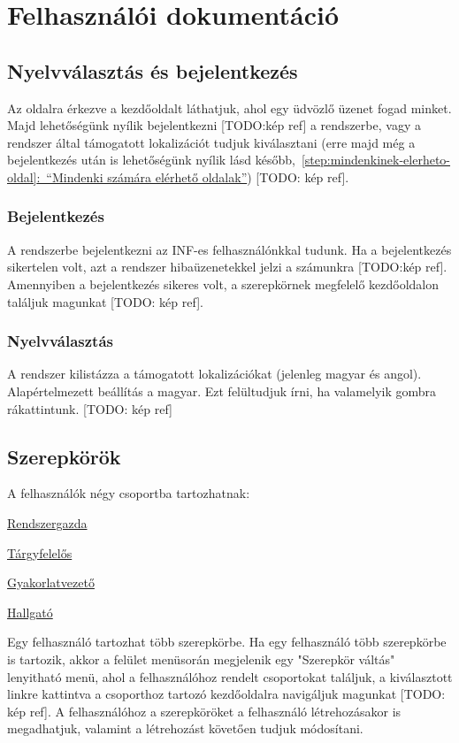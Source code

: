\chapter{Felhasználói dokumentáció} %
\label{ch:user}

\section{Nyelvválasztás és bejelentkezés}
Az oldalra érkezve a kezdőoldalt láthatjuk, ahol egy üdvözlő üzenet fogad minket. Majd lehetőségünk nyílik bejelentkezni [TODO:kép ref] a rendszerbe, vagy a rendszer által támogatott lokalizációt tudjuk kiválasztani (erre majd még a bejelentkezés után is lehetőségünk nyílik lásd később,~\hyperref[step:mindenkinek-elerheto-oldal]{\ref{step:mindenkinek-elerheto-oldal}:~``Mindenki számára elérhető oldalak''}) [TODO: kép ref].
\subsection{Bejelentkezés}
A rendszerbe bejelentkezni az INF-es felhasználónkkal tudunk. Ha a bejelentkezés sikertelen volt, azt a rendszer hibaüzenetekkel jelzi a számunkra [TODO:kép ref]. Amennyiben a bejelentkezés sikeres volt, a szerepkörnek megfelelő kezdőoldalon találjuk magunkat [TODO: kép ref].
\subsection{Nyelvválasztás}
A rendszer kilistázza a támogatott lokalizációkat (jelenleg magyar és angol). Alapértelmezett beállítás a magyar. Ezt felültudjuk írni, ha valamelyik gombra rákattintunk. [TODO: kép ref]
\section{Szerepkörök}
A felhasználók négy csoportba tartozhatnak:
\begin{compactitem}
    \item \hyperref[step:admin-role]{Rendszergazda}
    \item \hyperref[step:teacher-role]{Tárgyfelelős}
    \item \hyperref[step:instructor-role]{Gyakorlatvezető}
    \item \hyperref[step:student-role]{Hallgató}
\end{compactitem}
Egy felhasználó tartozhat több szerepkörbe. Ha egy felhasználó több szerepkörbe is tartozik, akkor a felület menüsorán megjelenik egy "Szerepkör váltás" lenyitható menü, ahol a felhasználóhoz rendelt csoportokat találjuk, a kiválasztott linkre kattintva a csoporthoz tartozó kezdőoldalra navigáljuk magunkat [TODO: kép ref]. A felhasználóhoz a szerepköröket a felhasználó létrehozásakor is megadhatjuk, valamint a létrehozást követően tudjuk módosítani.

